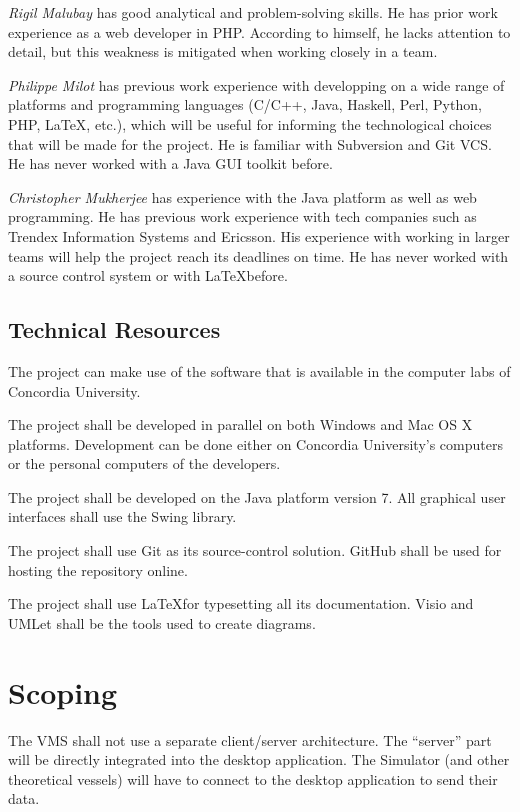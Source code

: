 \documentclass{article}
\begin{document}
\emph{Rigil Malubay} has good analytical and problem-solving skills. He has prior work experience as a web developer in PHP. According to himself, he lacks attention to detail, but this weakness is mitigated when working closely in a team.

\emph{Philippe Milot} has previous work experience with developping on a wide range of platforms and programming languages (C/C++, Java, Haskell, Perl, Python, PHP, \LaTeX, etc.), which will be useful for informing the technological choices that will be made for the project. He is familiar with Subversion and Git VCS. He has never worked with a Java GUI toolkit before.

\emph{Christopher Mukherjee} has experience with the Java platform as well as web programming. He has previous work experience with tech companies such as Trendex Information Systems and Ericsson. His experience with working in larger teams will help the project reach its deadlines on time. He has never worked with a source control system or with \LaTeX  before.

\subsection{Technical Resources} %

The project can make use of the software that is available in the computer labs of Concordia University. 

The project shall be developed in parallel on both Windows and Mac OS X platforms. Development can be done either on Concordia University's computers or the personal computers of the developers.

The project shall be developed on the Java platform version 7. All graphical user interfaces shall use the Swing library.

The project shall use Git as its source-control solution. GitHub shall be used for hosting the repository online.

The project shall use \LaTeX  for typesetting all its documentation. Visio and UMLet shall be the tools used to create diagrams.

\section{Scoping} %
The VMS shall not use a separate client/server architecture. The ``server'' part will be directly integrated into the desktop application. The Simulator (and other theoretical vessels) will have to connect to the desktop application to send their data.
\end{document}
